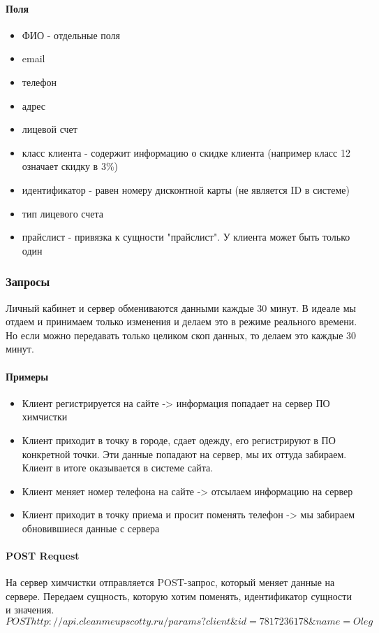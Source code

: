 \documentclass[DIV=calc, paper=a4, fontsize=11pt]{scrartcl} %
\begin{document}
\paragraph{Поля}
\begin{itemize}
	\item ФИО - отдельные поля
	\item email
	\item телефон
	\item адрес
	\item лицевой счет
	\item класс клиента - содержит информацию о скидке клиента (например класс 12 означает скидку в 3\%)
	\item идентификатор - равен номеру дисконтной карты (не является ID в системе)
	\item тип лицевого счета
	\item прайслист - привязка к сущности "прайслист". У клиента может быть только один
\end{itemize}

\subsubsection{Запросы}
Личный кабинет и сервер обмениваются данными каждые 30 минут. В идеале мы отдаем и принимаем только изменения и делаем это в режиме реального времени. Но если можно передавать только целиком скоп данных, то делаем это каждые 30 минут.
\paragraph{Примеры}
\begin{itemize}
	\item Клиент регистрируется на сайте -> информация попадает на сервер ПО химчистки
	\item Клиент приходит в точку в городе, сдает одежду, его регистрируют в ПО конкретной точки. Эти данные попадают на сервер, мы их оттуда забираем. Клиент в итоге оказывается в системе сайта.
	\item Клиент меняет номер телефона на сайте -> отсылаем информацию на сервер
	\item Клиент приходит в точку приема и просит поменять телефон -> мы забираем обновившиеся данные с сервера
\end{itemize}


\paragraph{POST Request}
На сервер химчистки отправляется POST-запрос, который меняет данные на сервере. Передаем сущность, которую хотим поменять, идентификатор сущности и значения.
\begin{displaymath}
	POST http://api.cleanmeupscotty.ru/params?client\&id=7817236178\&name=Oleg
\end{displaymath}	
\end{document}
